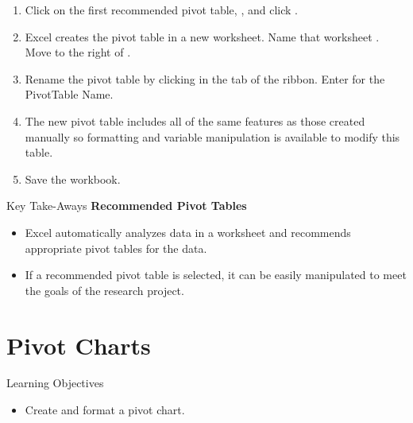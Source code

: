\begin{enumerate}[resume]
	\item Click on the first recommended pivot table, , and click .
	\item Excel creates the pivot table in a new worksheet. Name that worksheet .
	Move  to the right of .
	\item Rename the pivot table by clicking  in the  tab of the ribbon. Enter  for the PivotTable Name.	
	\item The new pivot table includes all of the same features as those created manually so formatting and variable manipulation is available to modify this table.
	\item Save the workbook.
\end{enumerate}

\begin{center}
	\begin{tkwbox}{Key Take-Aways}
		\textbf{Recommended Pivot Tables}
		\\
		\begin{itemize}
			\setlength{\itemsep}{0pt}
			\setlength{\parskip}{0pt}
			\setlength{\parsep}{0pt}
			
			\item Excel automatically analyzes data in a worksheet and recommends appropriate pivot tables for the data.
			\item If a recommended pivot table is selected, it can be easily manipulated to meet the goals of the research project.
			
		\end{itemize}
	\end{tkwbox}
\end{center}

\section{Pivot Charts}

\begin{center}
	\begin{objbox}{Learning Objectives}
		\begin{itemize}
			\setlength{\itemsep}{0pt}
			\setlength{\parskip}{0pt}
			\setlength{\parsep}{0pt}
			
			\item Create and format a pivot chart.
			
		\end{itemize}
	\end{objbox}
\end{center}

